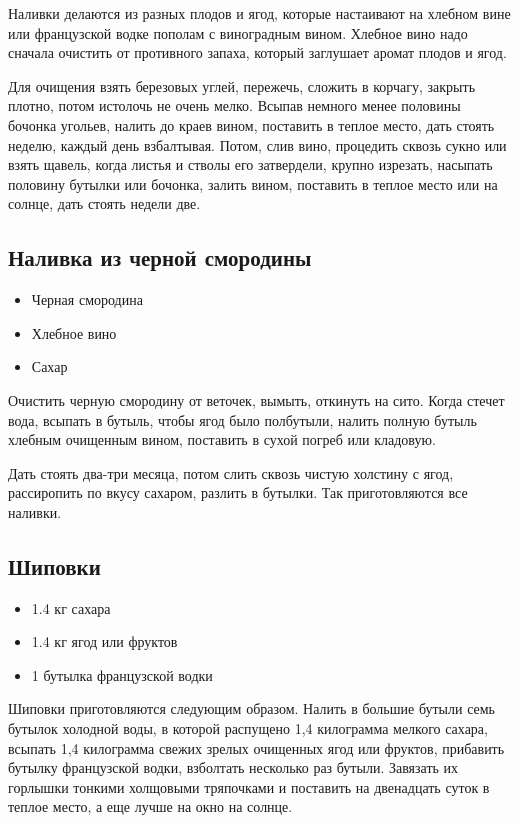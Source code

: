 Наливки делаются из разных плодов и ягод, которые настаивают на хлебном вине или французской водке пополам с виноградным вином. Хлебное вино надо сначала очистить от противного запаха, который заглушает аромат плодов и ягод.

Для очищения взять березовых углей, пережечь, сложить в корчагу, закрыть плотно, потом истолочь не очень мелко. Всыпав немного менее половины бочонка угольев, налить до краев вином, поставить в теплое место, дать стоять неделю, каждый день взбалтывая. Потом, слив вино, процедить сквозь сукно или взять щавель, когда листья и стволы его затвердели, крупно изрезать, насыпать половину бутылки или бочонка, залить вином, поставить в теплое место или на солнце, дать стоять недели две.

\subsection{Наливка из черной смородины}

\begin{itemize}
	\item Черная смородина 
    \item Хлебное вино 
    \item Сахар
\end{itemize}

Очистить черную смородину от веточек, вымыть, откинуть на сито. Когда стечет вода, всыпать в бутыль, чтобы ягод было полбутыли, налить полную бутыль хлебным очищенным вином, поставить в сухой погреб или кладовую.

Дать стоять два-три месяца, потом слить сквозь чистую холстину с ягод, рассиропить по вкусу сахаром, разлить в бутылки. Так приготовляются все наливки.

\subsection{Шиповки}

\begin{itemize}
	\item 1.4 кг сахара 
    \item 1.4 кг ягод или фруктов 
    \item 1 бутылка французской водки
\end{itemize}

Шиповки приготовляются следующим образом. Налить в большие бутыли семь бутылок холодной воды, в которой распущено 1,4 килограмма мелкого сахара, всыпать 1,4 килограмма свежих зрелых очищенных ягод или фруктов, прибавить бутылку французской водки, взболтать несколько раз бутыли. Завязать их горлышки тонкими холщовыми тряпочками и поставить на двенадцать суток в теплое место, а еще лучше на окно на солнце.

